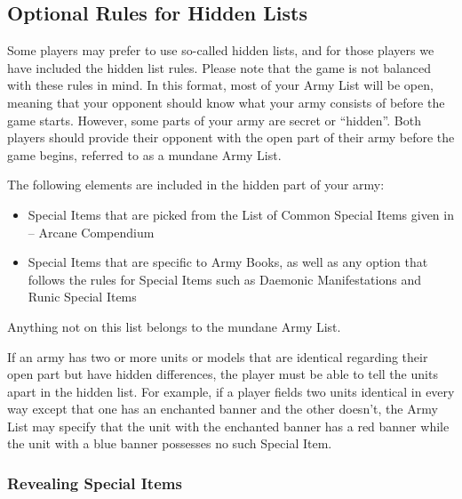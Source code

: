\begin{optionalrules}
\raggedcolumns
\begin{multicols}{2}
\subsection{Optional Rules for Hidden Lists}
\label{optional_rules_for_hidden_lists}

Some players may prefer to use so-called hidden lists, and for those players we have included the hidden list rules. Please note that the game is not balanced with these rules in mind. In this format, most of your Army List will be open, meaning that your opponent should know what your army consists of before the game starts. However, some parts of your army are secret or \enquote{hidden}. Both players should provide their opponent with the open part of their army before the game begins, referred to as a mundane Army List.

The following elements are included in the hidden part of your army:

\begin{itemize}
\item Special Items that are picked from the List of Common Special Items given in \nameofthegame{} -- Arcane Compendium
\item Special Items that are specific to Army Books, as well as any option that follows the rules for Special Items such as Daemonic Manifestations and Runic Special Items
\end{itemize}

Anything not on this list belongs to the mundane Army List.

If an army has two or more units or models that are identical regarding their open part but have hidden differences, the player must be able to tell the units apart in the hidden list. For example, if a player fields two units identical in every way except that one has an enchanted banner and the other doesn't, the Army List may specify that the unit with the enchanted banner has a red banner while the unit with a blue banner possesses no such Special Item.

\columnbreak

\subsubsection{Revealing Special Items}


\end{multicols}
\end{optionalrules}

